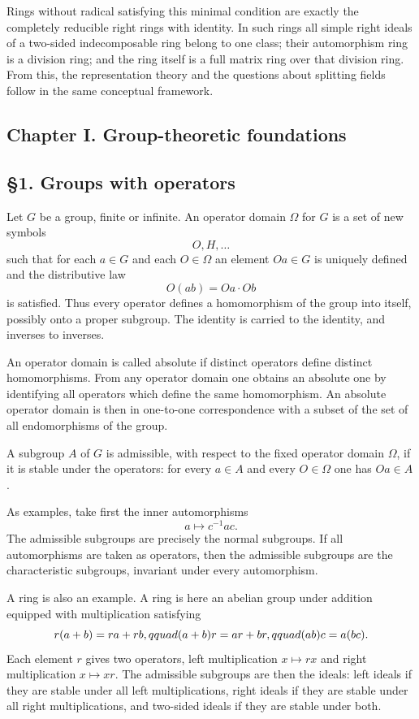 \documentclass[
  12pt,
]{article}
\begin{document}
Rings without radical satisfying this minimal condition are exactly the
completely reducible right rings with identity. In such rings all simple
right ideals of a two-sided indecomposable ring belong to one class;
their automorphism ring is a division ring; and the ring itself is a
full matrix ring over that division ring. From this, the representation
theory and the questions about splitting fields follow in the same
conceptual framework.

\subsection{Chapter I. Group-theoretic
foundations}\label{chapter-i.-group-theoretic-foundations}

\subsection{§1. Groups with operators}\label{groups-with-operators}

Let \(G\) be a group, finite or infinite. An operator domain \(\Omega\)
for \(G\) is a set of new symbols \[
  O,H,\ldots
\] such that for each \(a\in G\) and each \(O\in\Omega\) an element
\(Oa\in G\) is uniquely defined and the distributive law \[
  O(ab)=Oa\cdot Ob
\] is satisfied. Thus every operator defines a homomorphism of the group
into itself, possibly onto a proper subgroup. The identity is carried to
the identity, and inverses to inverses.

An operator domain is called absolute if distinct operators define
distinct homomorphisms. From any operator domain one obtains an absolute
one by identifying all operators which define the same homomorphism. An
absolute operator domain is then in one-to-one correspondence with a
subset of the set of all endomorphisms of the group.

A subgroup \(A\) of \(G\) is admissible, with respect to the fixed
operator domain \(\Omega\), if it is stable under the operators: for
every \(a\in A\) and every \(O\in\Omega\) one has \(Oa\in A\).

As examples, take first the inner automorphisms \[
  a\mapsto c^{-1}ac.
\] The admissible subgroups are precisely the normal subgroups. If all
automorphisms are taken as operators, then the admissible subgroups are
the characteristic subgroups, invariant under every automorphism.

A ring is also an example. A ring is here an abelian group under
addition equipped with multiplication satisfying \[
  r(a+b)=ra+rb,
  \\qquad
  (a+b)r=ar+br,
  \\qquad
  (ab)c=a(bc).
\] Each element \(r\) gives two operators, left multiplication
\(x\mapsto rx\) and right multiplication \(x\mapsto xr\). The admissible
subgroups are then the ideals: left ideals if they are stable under all
left multiplications, right ideals if they are stable under all right
multiplications, and two-sided ideals if they are stable under both.
\end{document}
